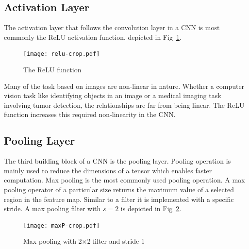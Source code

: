 \subsection{Activation Layer}

The activation layer that follows the convolution layer in a \ac{CNN} is most commonly the \ac{ReLU} activation function, depicted in Fig~\ref{fig:relu}.

\begin{figure}[!htbp]
	\centering
	\texttt{[image: relu-crop.pdf]}
	\caption{The \ac{ReLU} function}
	\label{fig:relu}
\end{figure}


Many of the task based on images are non-linear in nature. Whether a computer vision task like identifying objects in an image or a medical imaging task involving tumor detection, the relationships are far from being linear. The \ac{ReLU} function increases this required non-linearity in the \ac{CNN}. 

\subsection{Pooling Layer}

The third building block of a \ac{CNN} is the pooling layer. Pooling operation is mainly used to reduce the dimensions of a tensor which enables faster computation. Max pooling is the most commonly used pooling operation. A max pooling operator of a particular size returns the maximum value of a selected region in the feature map. Similar to a filter it is implemented with a specific stride. A max pooling filter with $s=2$ is depicted in Fig~\ref{fig:mp}.

\begin{figure}[!htbp]
	\centering
	\texttt{[image: maxP-crop.pdf]}
	\caption{Max pooling with 2$\times$2 filter and stride 1}
	\label{fig:mp}
\end{figure}


